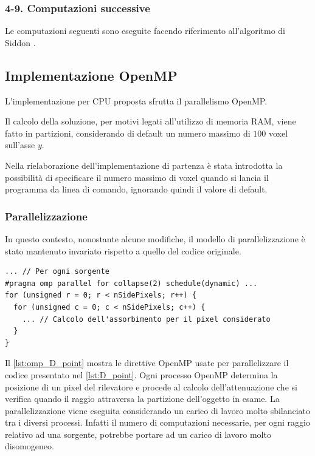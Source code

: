 \documentclass[12pt,a4paper]{report}
\begin{document}
\subsubsection{4-9. Computazioni successive}

Le computazioni seguenti sono eseguite facendo riferimento all'algoritmo di Siddon \cite{Siddon1984}.

\subsection{Implementazione OpenMP}

L'implementazione per CPU proposta sfrutta il parallelismo OpenMP.

Il calcolo della soluzione, per motivi legati all'utilizzo di memoria RAM, viene fatto in partizioni, considerando di default un
numero massimo di \(100\) voxel sull'asse \(y\).

Nella rielaborazione dell'implementazione di partenza \cite{Colletta2024} è stata introdotta la possibilità di specificare il
numero massimo di voxel quando si lancia il programma da linea di comando, ignorando quindi il valore di default.

\subsubsection{Parallelizzazione}

In questo contesto, nonostante alcune modifiche, il modello di parallelizzazione è stato mantenuto invariato rispetto a quello del
codice originale.

\begin{lstlisting}[language=CStyle, caption={Codice C per il calcolo dell'assorbimento di un determinato pixel del rilevatore.}, label={lst:omp_D_point}]
... // Per ogni sorgente
#pragma omp parallel for collapse(2) schedule(dynamic) ...
for (unsigned r = 0; r < nSidePixels; r++) {
  for (unsigned c = 0; c < nSidePixels; c++) {
    ... // Calcolo dell'assorbimento per il pixel considerato
  }
}
\end{lstlisting}

Il \autoref{lst:omp_D_point} mostra le direttive OpenMP usate per parallelizzare il codice presentato nel \autoref{lst:D_point}.
Ogni processo OpenMP determina la posizione di un pixel del rilevatore e procede al calcolo dell'attenuazione che si verifica
quando il raggio attraversa la partizione dell'oggetto in esame.
La parallelizzazione viene eseguita considerando un carico di lavoro molto sbilanciato tra i diversi processi.
Infatti il numero di computazioni necessarie, per ogni raggio relativo ad una sorgente, potrebbe portare ad un carico di lavoro
molto disomogeneo.
\end{document}
